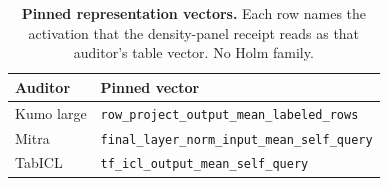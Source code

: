 \begin{table}[t]
\caption{\textbf{Pinned representation vectors.} Each row names the activation that the density-panel receipt reads as that auditor's table vector. No Holm family.}
\label{tab:mfs-v3-layers}
\centering
\scriptsize
\begin{tabular}{@{}l>{\raggedright\arraybackslash}p{2.15in}@{}}
\toprule
Auditor & Pinned vector \\
\midrule
Kumo large & \texttt{row\_\allowbreak{}project\_\allowbreak{}output\_\allowbreak{}mean\_\allowbreak{}labeled\_\allowbreak{}rows} \\
Mitra & \texttt{final\_\allowbreak{}layer\_\allowbreak{}norm\_\allowbreak{}input\_\allowbreak{}mean\_\allowbreak{}self\_\allowbreak{}query} \\
TabICL & \texttt{tf\_\allowbreak{}icl\_\allowbreak{}output\_\allowbreak{}mean\_\allowbreak{}self\_\allowbreak{}query} \\
\bottomrule
\end{tabular}
\end{table}
